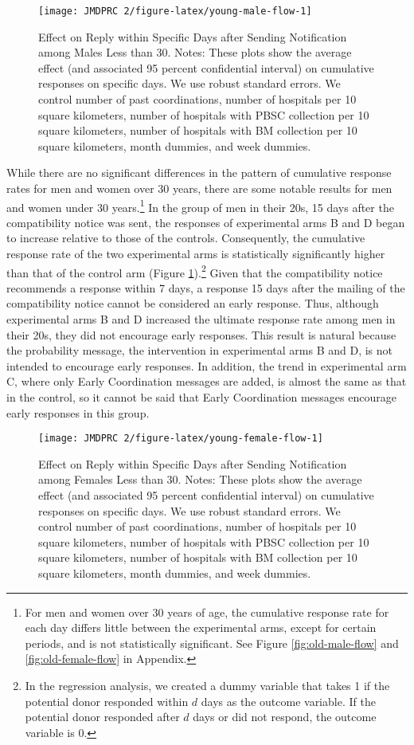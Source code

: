 \documentclass[
  11pt,
  a4paper
]{article}
\begin{document}
\begin{figure}[t]
\texttt{[image: JMDPRC~2/figure-latex/young-male-flow-1]} \caption{Effect on Reply within Specific Days after Sending Notification among Males Less than 30. Notes: These plots show the average effect (and associated 95 percent confidential interval) on cumulative responses on specific days. We use robust standard errors. We control number of past coordinations, number of hospitals per 10 square kilometers, number of hospitals with PBSC collection per 10 square kilometers, number of hospitals with BM collection per 10 square kilometers, month dummies, and week dummies.}\label{fig:young-male-flow}
\end{figure}

While there are no significant differences in the pattern of cumulative response rates for men and women over 30 years, there are some notable results for men and women under 30 years.\footnote{For men and women over 30 years of age, the cumulative response rate for each day differs little between the experimental arms, except for certain periods, and is not statistically significant. See Figure \ref{fig:old-male-flow} and \ref{fig:old-female-flow} in Appendix.} In the group of men in their 20s, 15 days after the compatibility notice was sent, the responses of experimental arms B and D began to increase relative to those of the controls. Consequently, the cumulative response rate of the two experimental arms is statistically significantly higher than that of the control arm (Figure \ref{fig:young-male-flow}).\footnote{In the regression analysis, we created a dummy variable that takes 1 if the potential donor responded within \(d\) days as the outcome variable. If the potential donor responded after \(d\) days or did not respond, the outcome variable is 0.} Given that the compatibility notice recommends a response within 7 days, a response 15 days after the mailing of the compatibility notice cannot be considered an early response. Thus, although experimental arms B and D increased the ultimate response rate among men in their 20s, they did not encourage early responses. This result is natural because the probability message, the intervention in experimental arms B and D, is not intended to encourage early responses. In addition, the trend in experimental arm C, where only Early Coordination messages are added, is almost the same as that in the control, so it cannot be said that Early Coordination messages encourage early responses in this group.

\begin{figure}[t]
\texttt{[image: JMDPRC~2/figure-latex/young-female-flow-1]} \caption{Effect on Reply within Specific Days after Sending Notification among Females Less than 30. Notes: These plots show the average effect (and associated 95 percent confidential interval) on cumulative responses on specific days. We use robust standard errors. We control number of past coordinations, number of hospitals per 10 square kilometers, number of hospitals with PBSC collection per 10 square kilometers, number of hospitals with BM collection per 10 square kilometers, month dummies, and week dummies.}\label{fig:young-female-flow}
\end{figure}
\end{document}

